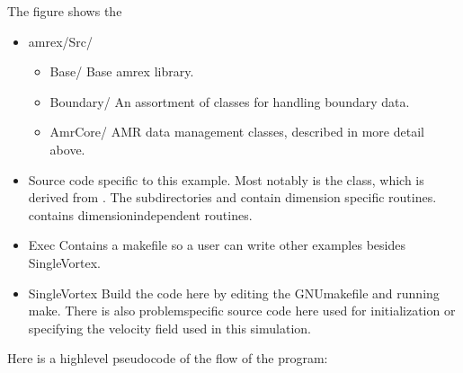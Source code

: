\documentclass[letterpaper,10pt,english]{sphinxmanual}
\begin{document}
\sphinxAtStartPar
The figure shows the {\hyperref[\detokenize{AmrCore:fig-amradvection-amrcore-flowchart}]{}}
\begin{itemize}
\item {} 
\sphinxAtStartPar
amrex/Src/
\begin{itemize}
\item {} 
\sphinxAtStartPar
Base/ Base amrex library.

\item {} 
\sphinxAtStartPar
Boundary/ An assortment of classes for handling boundary data.

\item {} 
\sphinxAtStartPar
AmrCore/ AMR data management classes, described in more detail above.

\end{itemize}

\item {} 
\sphinxAtStartPar
{} Source code specific to this example. Most notably
is the  class, which is derived from . The subdirectories 
and  contain dimension specific routines.  contains dimension\sphinxhyphen{}independent routines.

\item {} 
\sphinxAtStartPar
Exec Contains a makefile so a user can write other examples besides SingleVortex.

\item {} 
\sphinxAtStartPar
SingleVortex Build the code here by editing the GNUmakefile and running make. There
is also problem\sphinxhyphen{}specific source code here used for initialization or specifying the velocity field used in this
simulation.

\end{itemize}

\sphinxAtStartPar
Here is a high\sphinxhyphen{}level pseudo\sphinxhyphen{}code of the flow of the program:
\end{document}
